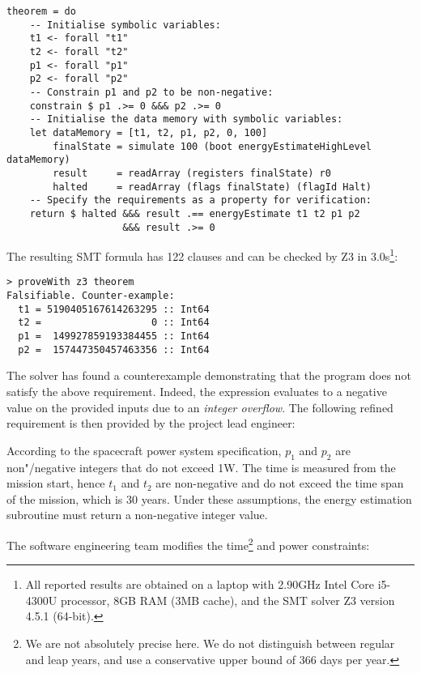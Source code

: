 \begin{verbatim}
theorem = do
    -- Initialise symbolic variables:
    t1 <- forall "t1"
    t2 <- forall "t2"
    p1 <- forall "p1"
    p2 <- forall "p2"
    -- Constrain p1 and p2 to be non-negative:
    constrain $ p1 .>= 0 &&& p2 .>= 0
    -- Initialise the data memory with symbolic variables:
    let dataMemory = [t1, t2, p1, p2, 0, 100]
        finalState = simulate 100 (boot energyEstimateHighLevel dataMemory)
        result     = readArray (registers finalState) r0
        halted     = readArray (flags finalState) (flagId Halt)
    -- Specify the requirements as a property for verification:
    return $ halted &&& result .== energyEstimate t1 t2 p1 p2
                    &&& result .>= 0
\end{verbatim}

\noindent
The resulting SMT formula has 122 clauses and can be checked by Z3 in
3.0s\footnote{All reported results are obtained on a laptop with 2.90GHz Intel
Core i5-4300U processor, 8GB RAM (3MB cache), and the SMT solver Z3 version 4.5.1 (64-bit).}:


\begin{verbatim}
> proveWith z3 theorem
Falsifiable. Counter-example:
  t1 = 5190405167614263295 :: Int64
  t2 =                   0 :: Int64
  p1 =  149927859193384455 :: Int64
  p2 =  157447350457463356 :: Int64
\end{verbatim}


The solver has found a counterexample demonstrating that the program does not
satisfy the above requirement. Indeed, the expression evaluates to a negative
value on the provided inputs due to an \emph{integer overflow}. The following
refined requirement is then provided by the project lead engineer:


\begin{tcolorbox}

According to the spacecraft power system specification, $p_1$ and $p_2$ are
non"/negative integers that do not exceed 1W. The time is measured
from the mission start, hence $t_1$ and $t_2$ are non-negative and do not exceed
the time span of the mission, which is 30 years. Under these assumptions,
the energy estimation subroutine must return a non-negative integer value.

\end{tcolorbox}

\noindent
The software engineering team modifies the time\footnote{We are not absolutely
precise here. We do not distinguish between regular and leap years, and use
a conservative upper bound of 366 days per year.} and power constraints:


